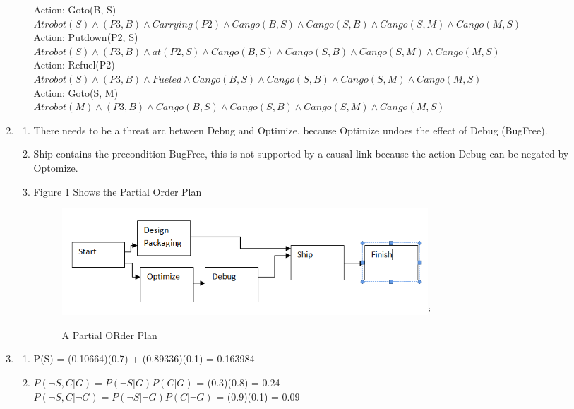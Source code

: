 \documentclass[11pt,fleqn]{article}
\begin{document}
\begin{enumerate}
\begin{enumerate}
Action: Goto(B, S) \\ 
$Atrobot(S)  \land (P3,B)  \land Carrying(P2) \land Cango(B,S) \land Cango(S,B) \land Cango(S, M) \land Cango(M,S)$ \\

Action: Putdown(P2, S) \\ 
$Atrobot(S)  \land (P3,B)  \land at(P2, S) \land Cango(B,S) \land Cango(S,B) \land Cango(S, M) \land Cango(M,S)$ \\

Action: Refuel(P2) \\
$Atrobot(S)  \land (P3,B)  \land Fueled \land Cango(B,S) \land Cango(S,B) \land Cango(S, M) \land Cango(M,S)$ \\

Action: Goto(S, M) \\
$Atrobot(M) \land (P3, B) \land Cango(B,S) \land Cango(S,B) \land Cango(S, M) \land Cango(M,S)$\\

\end{enumerate}

\item %

\begin{enumerate}
\item There needs to be a threat arc between Debug and Optimize, because Optimize undoes the effect of Debug (BugFree). 
\item 
Ship contains the precondition BugFree, this is not supported by a causal link because the action Debug can be negated by Optomize. 
\item 
Figure 1 Shows the Partial Order Plan
\begin{figure}[h]
\begin{center}
\includegraphics[height=40mm]{pop.png}`
\caption{A Partial ORder Plan}

\end{center}
\end{figure}
\end{enumerate}
\item %
\begin{enumerate}
\item %
P(S) = (0.10664)(0.7) + (0.89336)(0.1) = 0.163984 
\item %
$P(\lnot S,C | G) = P(\lnot S | G) P(C | G)$ = (0.3)(0.8) = 0.24\\
$P(\lnot S,C | \lnot G) = P(\lnot S | \lnot G) P(C | \lnot G)$ = (0.9)(0.1) = 0.09 \\


\end{enumerate}
\end{enumerate}
\end{document}
